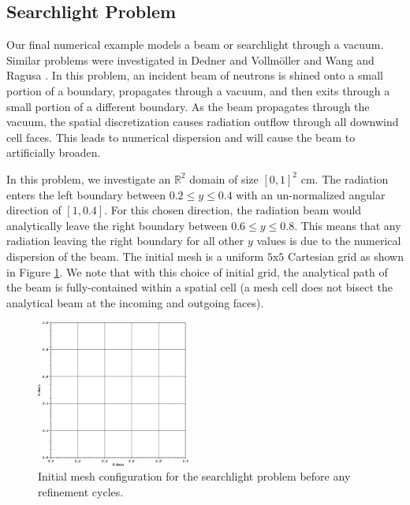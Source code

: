 \subsection{Searchlight Problem}
\label{sec::BF_Results_SL}

Our final numerical example models a beam or searchlight through a vacuum. Similar problems were investigated in Dedner and Vollm{\"o}ller \cite{dedner2002adaptive} and Wang and Ragusa \cite{wang2011standard}. In this problem, an incident beam of neutrons is shined onto a small portion of a boundary, propagates through a vacuum, and then exits through a small portion of a different boundary. As the beam propagates through the vacuum, the spatial discretization causes radiation outflow through all downwind cell faces. This leads to numerical dispersion and will cause the beam to artificially broaden.

In this problem, we investigate an $\mathbb{R}^2$ domain of size $[0,1]^2$ cm. The radiation enters the left boundary between $0.2 \leq y \leq 0.4$ with an un-normalized angular direction of $[1,0.4]$. For this chosen direction, the radiation beam would analytically leave the right boundary between $0.6 \leq y \leq 0.8$. This means that any radiation leaving the right boundary for all other $y$ values is due to the numerical dispersion of the beam. The initial mesh is a uniform $5 \text{x} 5$ Cartesian grid as shown in Figure \ref{fig::BF_Results_SL_starting_mesh}. We note that with this choice of initial grid, the analytical path of the beam is fully-contained within a spatial cell (a mesh cell does not bisect the analytical beam at the incoming and outgoing faces). 

\begin{figure}
\centering
\includegraphics[width=0.45\textwidth]{figures/sec_BF/searchlight_starting_mesh.eps}
\caption{Initial mesh configuration for the searchlight problem before any refinement cycles.}
\label{fig::BF_Results_SL_starting_mesh}
\end{figure}

